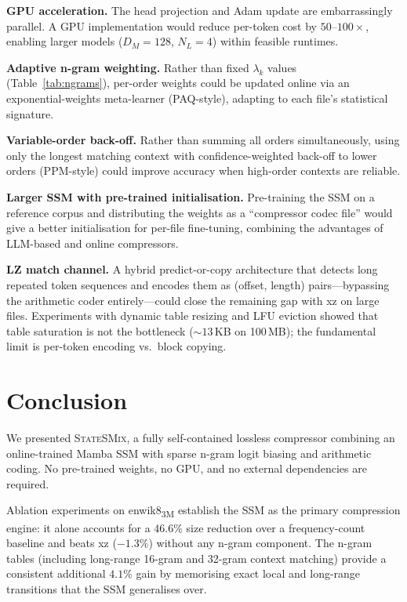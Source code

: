 \documentclass[10pt,twocolumn]{article}
\newcommand{\ssmcomp}{\textsc{StateSMix}}
\begin{document}
\textbf{GPU acceleration.}  The head projection and Adam update
are embarrassingly parallel.  A GPU implementation would reduce
per-token cost by $50$--$100\times$, enabling larger models
($D_M=128$, $N_L=4$) within feasible runtimes.

\textbf{Adaptive n-gram weighting.}  Rather than fixed
$\lambda_k$ values (Table~\ref{tab:ngrams}), per-order weights
could be updated online via an exponential-weights meta-learner
(PAQ-style), adapting to each file's statistical signature.

\textbf{Variable-order back-off.}  Rather than summing all orders
simultaneously, using only the longest matching context with
confidence-weighted back-off to lower orders (PPM-style) could
improve accuracy when high-order contexts are reliable.

\textbf{Larger SSM with pre-trained initialisation.}  Pre-training
the SSM on a reference corpus and distributing the weights as a
``compressor codec file'' would give a better initialisation for
per-file fine-tuning, combining the advantages of LLM-based and
online compressors.

\textbf{LZ match channel.}  A hybrid predict-or-copy architecture
that detects long repeated token sequences and encodes them as
(offset, length) pairs---bypassing the arithmetic coder entirely---could
close the remaining gap with xz on large files.  Experiments with
dynamic table resizing and LFU eviction showed that table saturation
is not the bottleneck (${\sim}13$\,KB on 100\,MB); the fundamental
limit is per-token encoding vs.\ block copying.

\section{Conclusion}
\label{sec:conclusion}

We presented \ssmcomp{}, a fully self-contained lossless compressor
combining an online-trained Mamba SSM with sparse n-gram logit biasing
and arithmetic coding.  No pre-trained weights, no GPU, and no external
dependencies are required.

Ablation experiments on enwik8\textsubscript{3M} establish the SSM as
the primary compression engine: it alone accounts for a $46.6\%$ size
reduction over a frequency-count baseline and beats xz ($-1.3\%$)
without any n-gram component.  The n-gram tables (including long-range
16-gram and 32-gram context matching) provide a consistent
additional $4.1\%$ gain by memorising exact local and long-range
transitions that the SSM generalises over.
\end{document}

